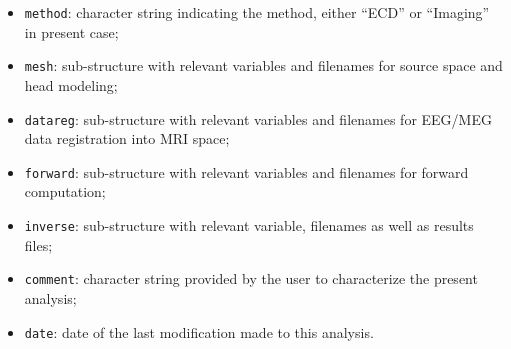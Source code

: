 \begin{itemize}
    \item \texttt{method}: character string indicating the method, either ``ECD'' or ``Imaging'' in present case;
    \item \texttt{mesh}: sub-structure with relevant variables and filenames for source space and head modeling;
    \item \texttt{datareg}: sub-structure with relevant variables and filenames for EEG/MEG data registration into MRI space;
    \item \texttt{forward}: sub-structure with relevant variables and filenames for forward computation;
    \item \texttt{inverse}: sub-structure with relevant variable, filenames as well as results files;
    \item \texttt{comment}: character string provided by the user to characterize the present analysis;
    \item \texttt{date}: date of the last modification made to this analysis.
\end{itemize}
